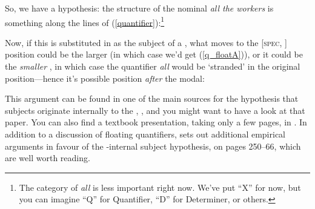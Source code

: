 \documentclass{article}
\begin{document}
So, we have a hypothesis: the structure of the nominal \emph{all the workers} is something along the lines of (\ref{quantifier}):\footnote{The category of \emph{all} is less important right now. We've put ``X'' for now, but you can imagine ``Q'' for Quantifier, ``D'' for Determiner, or others.}
\begin{exe}
    \label{quantifier}
\end{exe}
Now, if this is substituted in as the subject of a , what moves to the [\textsc{spec}, ] position could be the larger  (in which case we'd get (\ref{q_floatA})), or it could be the \emph{smaller} , in which case the quantifier \emph{all} would be `stranded' in the original position---hence it's possible position \emph{after} the modal:
\begin{exe}
    \label{q_float}
\end{exe}
This argument can be found in one of the main sources for the hypothesis that subjects originate internally to the , \citet{koopman_position_1991}, and you might want to have a look at that paper.
You can also find a textbook presentation, taking only a few pages, in \citet{haegeman_thinking_2006}.
In addition to a discussion of floating quantifiers, \citeauthor{haegeman_thinking_2006} sets out additional empirical arguments in favour of the -internal subject hypothesis, on pages 250--66, which are well worth reading.
\end{document}
